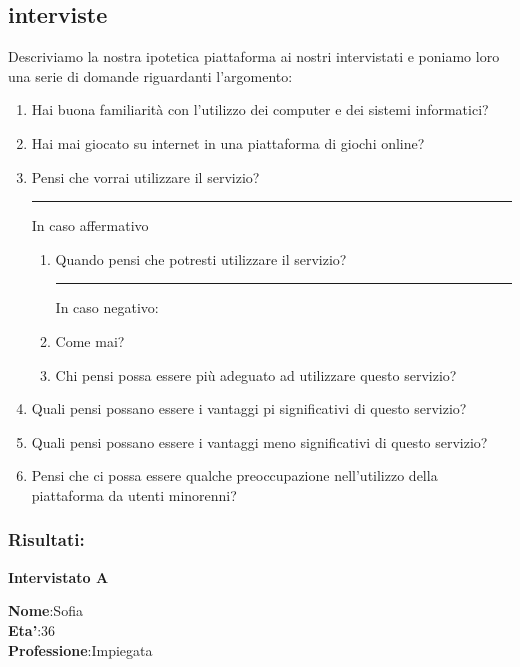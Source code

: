 \documentclass[../Report.tex]{subfiles}
\begin{document}
    
    \subsection{interviste}
    Descriviamo la nostra ipotetica piattaforma ai nostri intervistati e poniamo loro una serie di domande riguardanti l’argomento:
   
    \begin{enumerate}
    \item Hai buona familiarità con l’utilizzo dei computer e dei sistemi informatici?
    \item Hai mai giocato su internet in una piattaforma di giochi online?
    \item Pensi che vorrai utilizzare il servizio?\\
        \hrule In caso affermativo\\
        \begin{enumerate}
            \item Quando pensi che potresti utilizzare il servizio?\\ \hrule In caso negativo: 
            \item Come mai?
            \item Chi pensi possa essere più adeguato ad utilizzare questo servizio?
        \end{enumerate}
    \item	Quali pensi possano essere i vantaggi pi significativi di questo servizio?
    \item	Quali pensi possano essere i vantaggi meno significativi di questo servizio?
    \item	Pensi che ci possa essere qualche preoccupazione nell’utilizzo della piattaforma da utenti minorenni?
    \end{enumerate}

    \subsubsection{Risultati:}
    
    \textbf{Intervistato A}

    \textbf{Nome}:Sofia\\
    \textbf{Eta'}:36\\
    \textbf{Professione}:Impiegata\\
    
\end{document}
